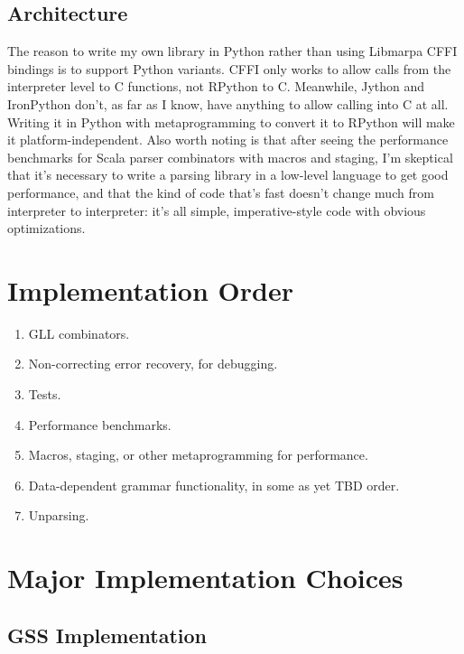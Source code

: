 \documentclass[12pt]{article}
\begin{document}
\subsection{Architecture}
\label{sec:architecture}

The reason to write my own library in Python rather than using
Libmarpa CFFI bindings is to support Python variants.  CFFI only works
to allow calls from the interpreter level to C functions, not RPython
to C.  Meanwhile, Jython and IronPython don't, as far as I know, have
anything to allow calling into C at all.  Writing it in Python with
metaprogramming to convert it to RPython will make it
platform-independent. Also worth noting is that after seeing the
performance benchmarks for Scala parser combinators with macros and
staging, I'm skeptical that it's necessary to write a parsing library
in a low-level language to get good performance, and that the kind of
code that's fast doesn't change much from interpreter to interpreter:
it's all simple, imperative-style code with obvious optimizations.


\section{Implementation Order}
\label{sec:implementation_order}

\begin{enumerate}
\item GLL combinators.
\item Non-correcting error recovery, for debugging.
\item Tests.
\item Performance benchmarks.
\item Macros, staging, or other metaprogramming for performance.
\item Data-dependent grammar functionality, in some as yet TBD order.
\item Unparsing.
\end{enumerate}


\section{Major Implementation Choices}
\label{sec:implementation_choices}

\subsection{GSS Implementation}
\label{sec:gss_implementation}
\end{document}
